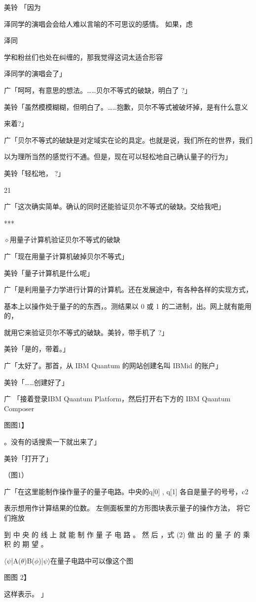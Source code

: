 美铃 「因为\par
泽同学的演唱会会给人难以言喻的不可思议的感情。 如果，虑\par
泽同\par
学和粉丝们也处在纠缠的，那我觉得这词太适合形容\par
泽同学的演唱会了」\par
广「呵呵，有意思的想法。……贝尔不等式的破缺，明白了 ?」\par
美铃「虽然模模糊糊，但明白了。……抱歉，贝尔不等式被破坏掉，是有什么意义\par
来着?」\par
广「贝尔不等式的破缺是对定域实在论的具定。也就是说，我们所在的世界，我们\par
以为理所当然的感觉行不通。但是，现在可以轻松地自己确认量子的行为」\par
美铃「轻松地， ?」\par

21\par
广「这次确实简单。确认的同时还能验证贝尔不等式的破缺。交给我吧」\par
***\par
$\diamond$用量子计算机验证贝尔不等式的破缺\par
广「现在用量子计算机破掉贝尔不等式」\par
美铃「量子计算机是什么呢」\par
广「是利用量子力学进行计算的计算机。还在发展途中，有各种各样的实现方式，\par
基本上以操作处于量子的的东西，。测结果以 0 或 1 的二进制，出。网上就有能用的，\par
就用它来验证贝尔不等式的破缺。美铃，带手机了 ?」\par
美铃「是的，带着。」\par
广「太好了。那首，从 IBM Quantum 的网站创建名叫 IBMid 的账户」\par
美铃「……创建好了」\par
广 「接着登录IBM Quantum Platform，然后打开右下方的 IBM Quantum Composer\par
图图1】\par
。没有的话搜索一下就出来了」\par
美铃「打开了」\par
（图1）\par
广「在这里能制作操作量子的量子电路。中央的q[0] , q[1] 各自是量子的号号，c2\par
表示想用作计算结果的位数。 左侧面板里的方形图块表示量子的操作方法， 将它们拖放\par
到 中 央 的 线 上 就 能 制 作 量 子 电 路 。 然 后 ，式 (2) 做 出 的 量 子 的 乘 积 的 期 望 。\par
$\langle$$\psi$|A($\theta$)B($\phi$)|$\psi$$\rangle$在量子电路中可以像这个图\par
图图 2】\par
这样表示。 」\par

